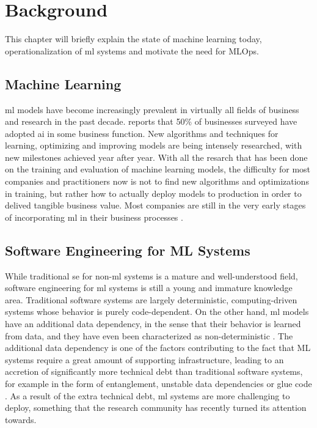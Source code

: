 \chapter{Background}
\label{ch:background}
This chapter will briefly explain the state of machine learning today, operationalization of \acrshort{ml} systems and motivate the need for MLOps.

\section{Machine Learning}
\acrshort{ml} models have become increasingly prevalent in virtually all fields of business and research in the past decade.
\textcite{mckinsey2020} reports that 50\% of businesses surveyed have adopted \acrfull{ai} in some business function.
New algorithms and techniques for learning, optimizing and improving models are being intensely researched, with new milestones achieved year after year.
With all the resarch that has been done on the training and evaluation of machine learning models, the difficulty for most companies and practitioners now is not to find new algorithms and optimizations in training, but rather how to actually deploy models to production in order to delived tangible business value.
Most companies are still in the very early stages of incorporating \acrshort{ml} in their business processes \cite{Schloegl2019}.

\section{Software Engineering for ML Systems}
While traditional \acrshort{se} for non-\acrshort{ml} systems is a mature and well-understood field, software engineering for \acrshort{ml} systems is still a young and immature knowledge area.
Traditional software systems are largely deterministic, computing-driven systems whose behavior is purely code-dependent.
On the other hand, \acrshort{ml} models have an additional data dependency, in the sense that their behavior is learned from data, and they have even been characterized as non-deterministic \cite{Giray2021, MartinezFernandez2021}.
The additional data dependency is one of the factors contributing to the fact that ML systems require a great amount of supporting infrastructure, leading to an accretion of significantly more technical debt than traditional software systems, for example in the form of entanglement, unstable data dependencies or glue code \cite{Sculley2015}.
As a result of the extra technical debt, \acrshort{ml} systems are more challenging to deploy, something that the research community has recently turned its attention towards.

